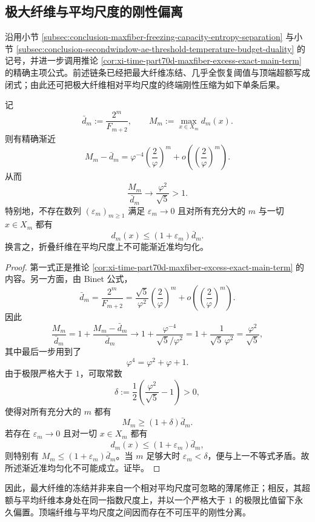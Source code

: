 \subsection{极大纤维与平均尺度的刚性偏离}\label{subsec:conclusion-maxfiber-average-scale-rigidity}
沿用小节 \ref{subsec:conclusion-maxfiber-freezing-capacity-entropy-separation} 与小节 \ref{subsec:conclusion-secondwindow-ae-threshold-temperature-budget-duality} 的记号，并进一步调用推论 \ref{cor:xi-time-part70d-maxfiber-excess-exact-main-term} 的精确主项公式。前述链条已经把最大纤维冻结、几乎全恢复阈值与顶端超额写成闭式；由此还可把极大纤维相对平均尺度的终端刚性压缩为如下单条后果。

\begin{theorem}[极大纤维相对平均尺度的刚性超额]\label{thm:conclusion-maxfiber-average-scale-rigidity}
记
\[
\bar d_m:=\frac{2^m}{F_{m+2}},
\qquad
M_m:=\max_{x\in X_m}d_m(x).
\]
则有精确渐近
\[
\boxed{\;
M_m-\bar d_m
=
\varphi^{-4}\left(\frac{2}{\varphi}\right)^m
+o\!\left(\left(\frac{2}{\varphi}\right)^m\right).\;}
\]
从而
\[
\boxed{\;
\frac{M_m}{\bar d_m}\longrightarrow \frac{\varphi^2}{\sqrt5}>1.\;}
\]
特别地，不存在数列 \((\varepsilon_m)_{m\ge 1}\) 满足 \(\varepsilon_m\to 0\) 且对所有充分大的 \(m\) 与一切 \(x\in X_m\) 都有
\[
d_m(x)\le (1+\varepsilon_m)\bar d_m.
\]
换言之，折叠纤维在平均尺度上不可能渐近准均匀化。
\end{theorem}
\begin{proof}
第一式正是推论 \ref{cor:xi-time-part70d-maxfiber-excess-exact-main-term} 的内容。另一方面，由 Binet 公式，
\[
\bar d_m
=
\frac{2^m}{F_{m+2}}
=
\frac{\sqrt5}{\varphi^2}\left(\frac{2}{\varphi}\right)^m
+o\!\left(\left(\frac{2}{\varphi}\right)^m\right).
\]
因此
\[
\frac{M_m}{\bar d_m}
=
1+\frac{M_m-\bar d_m}{\bar d_m}
\longrightarrow
1+\frac{\varphi^{-4}}{\sqrt5/\varphi^2}
=
1+\frac{1}{\sqrt5\,\varphi^2}
=
\frac{\varphi^2}{\sqrt5},
\]
其中最后一步用到了
\[
\varphi^4=\varphi^2+\varphi+1.
\]
由于极限严格大于 \(1\)，可取常数
\[
\delta:=\frac12\left(\frac{\varphi^2}{\sqrt5}-1\right)>0,
\]
使得对所有充分大的 \(m\) 都有
\[
M_m\ge (1+\delta)\bar d_m.
\]
若存在 \(\varepsilon_m\to 0\) 且对一切 \(x\in X_m\) 都有
\[
d_m(x)\le (1+\varepsilon_m)\bar d_m,
\]
则特别有 \(M_m\le (1+\varepsilon_m)\bar d_m\)。当 \(m\) 足够大时 \(\varepsilon_m<\delta\)，便与上一不等式矛盾。故所述渐近准均匀化不可能成立。证毕。
\end{proof}

\noindent
因此，最大纤维的冻结并非来自一个相对平均尺度可忽略的薄尾修正；相反，其超额与平均纤维本身处在同一指数尺度上，并以一个严格大于 \(1\) 的极限比值留下永久偏置。顶端纤维与平均尺度之间因而存在不可压平的刚性分离。

\endinput
